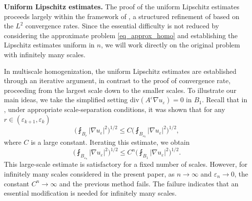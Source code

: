 \documentclass[reqno,12pt]{amsart} %
\theoremstyle{definition}
\theoremstyle{remark}
\numberwithin{equation}{section}
\newcommand{\e}{\varepsilon}
\begin{document}



\noindent\textbf{Uniform Lipschitz estimates.}
The proof of the uniform Lipschitz estimates proceeds largely within the framework of \cite{S17}, a structured refinement of \cite{AS16} based on the $L^2$ convergence rates. 
Since the essential difficulty is not reduced by considering the approximate problem \eqref{eq_approx_homo} and establishing the Lipschitz estimates uniform in $n$, we will work directly on the original problem with infinitely many scales. 

In multiscale homogenization, the uniform Lipschitz estimates are established through an iterative argument, in contrast to the proof of convergence rate, proceeding from the largest scale down to the smaller scales. To illustrate our main ideas, we take the simplified setting $\mathrm{div}(A^\e \nabla u_\e) = 0$ in $B_1$. Recall that in \cite{Niu20_reiterated}, under appropriate scale-separation conditions, it was shown that for any $r\in (\e_{k+1}, \e_k)$
\begin{equation}\label{est.largeLip}
    \bigg( \fint_{B_{r}} |\nabla u_\e|^2 \bigg)^{1/2} \le C \bigg( \fint_{B_{\e_k}} |\nabla u_\e|^2 \bigg)^{1/2},
\end{equation}
where $C$ is a large constant. Iterating this estimate, we obtain
\begin{equation*}
    \bigg( \fint_{B_{\e_n}} |\nabla u_\e|^2 \bigg)^{1/2} \le C^n \bigg( \fint_{B_{1}} |\nabla u_\e|^2 \bigg)^{1/2}.
\end{equation*}
This large-scale estimate is satisfactory for a fixed number of scales. However, for infinitely many scales considered in the present paper, as $n\to \infty$ and $\e_n \to 0$, the constant $C^n \to \infty$ and the previous method fails. The failure indicates that an essential modification is needed for infinitely many scales.
\end{document}
